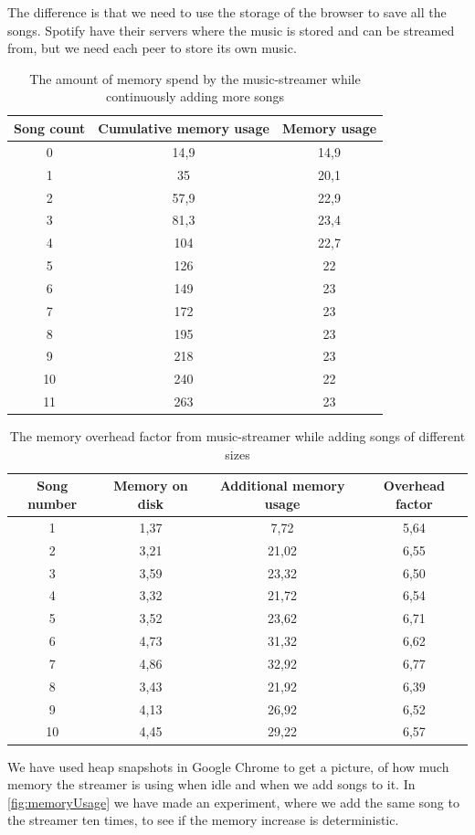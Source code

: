The difference is that we need to use the storage of the browser to save all the songs.
Spotify have their servers where the music is stored and can be streamed from,
but we need each peer to store its own music.

\begin{table}[]
\centering
\begin{tabular}{|c|c|c|} \hline
Song count & Cumulative memory usage & Memory usage \\ \hline
0  & 14,9 & 14,9 \\
1  & 35   & 20,1 \\
2  & 57,9 & 22,9 \\
3  & 81,3 & 23,4 \\
4  & 104  & 22,7 \\
5  & 126  & 22   \\
6  & 149  & 23   \\
7  & 172  & 23   \\
8  & 195  & 23   \\
9  & 218  & 23   \\
10 & 240  & 22   \\
11 & 263  & 23   \\ \hline
\end{tabular}
\caption{The amount of memory spend by the music-streamer while continuously adding more songs}
\label{tab:memoryUsage}
\end{table}

\begin{table}[]
\centering
\begin{tabular}{|c|c|c|c|} \hline
Song number & Memory on disk & Additional memory usage & Overhead factor \\ \hline
1  & 1,37 & 7,72  & 5,64 \\
2  & 3,21 & 21,02 & 6,55 \\
3  & 3,59 & 23,32 & 6,50 \\
4  & 3,32 & 21,72 & 6,54 \\
5  & 3,52 & 23,62 & 6,71 \\
6  & 4,73 & 31,32 & 6,62 \\
7  & 4,86 & 32,92 & 6,77 \\
8  & 3,43 & 21,92 & 6,39 \\
9  & 4,13 & 26,92 & 6,52 \\
10 & 4,45 & 29,22 & 6,57 \\ \hline
\end{tabular}
\caption{The memory overhead factor from music-streamer while adding songs of different sizes}
\label{tab:memoryDiffSizes}
\end{table}		
\noindent
We have used heap snapshots in Google Chrome to get a picture,
of how much memory the streamer is using when idle and when we add songs to it. 
In \ref{fig:memoryUsage} we have made an experiment,
where we add the same song to the streamer ten times,
to see if the memory increase is deterministic.

